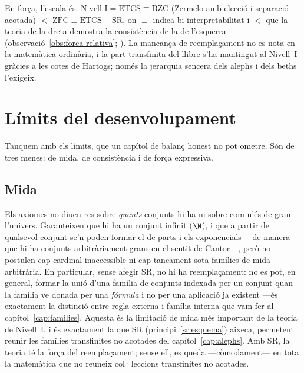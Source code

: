 \begin{observacio}\label{obs:forca-taula}
En força, l'escala és: \(\text{Nivell~I}=\text{ETCS}\equiv\mathrm{BZC}\)
(Zermelo amb elecció i separació acotada) \(<\) \(\mathrm{ZFC}\equiv
\text{ETCS}+\text{SR}\), on \(\equiv\) indica bi-interpretabilitat i \(<\) que
la teoria de la dreta demostra la consistència de la de l'esquerra
(observació~\ref{obs:forca-relativa};
\cite{osius1974,mclarty-catset,shulman-comparing}). La mancança de
reemplaçament no es nota en la matemàtica ordinària, i la part transfinita
del llibre s'ha mantingut al Nivell~I gràcies a les cotes de Hartogs; només
la jerarquia sencera dels alephs i dels beths l'exigeix.
\end{observacio}

\section{Límits del desenvolupament}\label{sec:limits}

Tanquem amb els límits, que un capítol de balanç honest no pot ometre.
Són de tres menes: de mida, de consistència i de força expressiva.

\subsection{Mida}\label{subsec:mida}

Els axiomes no diuen res sobre \emph{quants} conjunts hi ha ni sobre com
n'és de gran l'univers. Garanteixen que hi ha un conjunt infinit
(\(\N\)), i que a partir de qualsevol conjunt se'n poden formar el de parts
i els exponencials ---de manera que hi ha conjunts arbitràriament grans en
el sentit de Cantor---, però no postulen cap cardinal inaccessible ni cap
tancament sota famílies de mida arbitrària. En particular, sense afegir SR,
no hi ha reemplaçament: no es pot, en general, formar la unió d'una família
de conjunts indexada per un conjunt quan la família ve donada per una
\emph{fórmula} i no per una aplicació ja existent ---és exactament la
distinció entre regla externa i família interna que vam fer al
capítol~\ref{cap:families}. Aquesta és la limitació de mida més important de
la teoria de Nivell~I, i és exactament la que SR (principi~\ref{sr:esquema})
aixeca, permetent reunir les famílies transfinites no acotades del
capítol~\ref{cap:alephs}. Amb SR, la teoria té la força del reemplaçament;
sense ell, es queda ---còmodament--- en tota la matemàtica que no reuneix
col·leccions transfinites no acotades.

